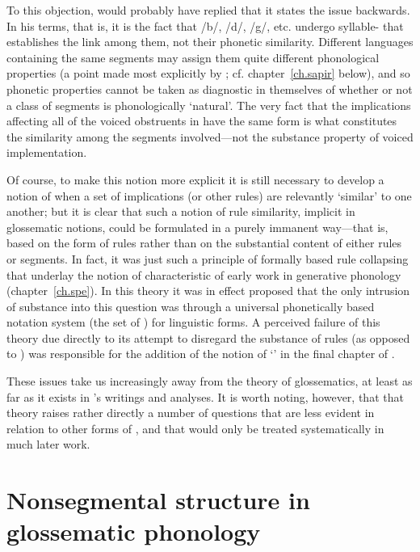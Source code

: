 To this objection, {\Hjelmslev} would probably have replied that it
states the issue backwards. In his terms, that is, it is the fact that
/b/, /d/, /g/, etc. undergo syllable- that establishes
the link among them, not their phonetic similarity. Different
languages containing the same segments may assign them quite different
phonological properties (a point made most explicitly by {\Sapir};
cf. chapter~\ref{ch.sapir} below), and so phonetic properties cannot
be taken as diagnostic in themselves of whether or not a class of
segments is phonologically `natural'. The very fact that the
implications affecting all of the voiced obstruents in  have the
same form is what constitutes the similarity among the segments
involved—not the substance property of voiced implementation.

Of course, to make this notion more explicit it is still necessary to
develop a notion of when a set of implications (or other {rules}) are
relevantly `similar' to one another; but it is clear that such a
notion of rule similarity, implicit in glossematic notions, could be
formulated in a purely immanent way—that is, based on the form of
{rules} rather than on the substantial content of either {rules} or
segments. In fact, it was just such a principle of formally based rule
collapsing that underlay the notion of  characteristic of
early work in generative phonology (chapter~\ref{ch.spe}). In this
theory it was in effect proposed that the only intrusion of substance
into this question was through a universal phonetically based notation
system (the set of ) for linguistic forms. A
perceived failure of this theory due directly to its attempt to
disregard the substance of {rules} (as opposed to ) was
responsible for the addition of the notion of `' in the
final chapter of \citet{spe}.

These issues take us increasingly away from the theory of
glossematics, at least as far as it exists in {\Hjelmslev}'s writings and
analyses. It is worth noting, however, that that theory raises rather
directly a number of questions that are less evident in relation to
other forms of , and that would only be treated
systematically in much later work.

\section{Nonsegmental structure in glossematic phonology}
\label{sec:nonseg-struct}

